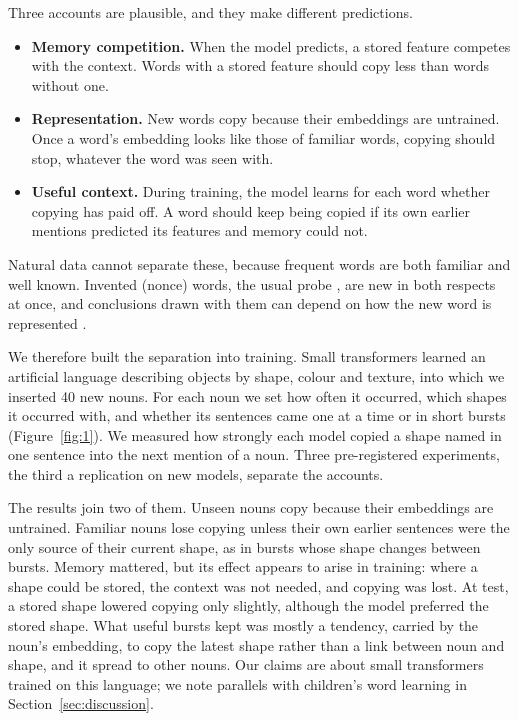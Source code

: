 \documentclass[11pt]{article}
\begin{document}
Three accounts are plausible, and they make different predictions.
\begin{itemize}[leftmargin=*,itemsep=1pt,topsep=2pt]
\item \textbf{Memory competition.} When the model predicts, a stored feature competes with the context. Words with a stored feature should copy less than words without one.
\item \textbf{Representation.} New words copy because their embeddings are untrained. Once a word's embedding looks like those of familiar words, copying should stop, whatever the word was seen with.
\item \textbf{Useful context.} During training, the model learns for each word whether copying has paid off. A word should keep being copied if its own earlier mentions predicted its features and memory could not.
\end{itemize}
Natural data cannot separate these, because frequent words are both familiar and well known. Invented (nonce) words, the usual probe \citep{thrush2020,misra2023}, are new in both respects at once, and conclusions drawn with them can depend on how the new word is represented \citep{kim2022lexical,cacioli2026me}.

We therefore built the separation into training. Small transformers learned an artificial language describing objects by shape, colour and texture, into which we inserted 40 new nouns. For each noun we set how often it occurred, which shapes it occurred with, and whether its sentences came one at a time or in short bursts (Figure~\ref{fig:1}). We measured how strongly each model copied a shape named in one sentence into the next mention of a noun. Three pre-registered experiments, the third a replication on new models, separate the accounts.

The results join two of them. Unseen nouns copy because their embeddings are untrained. Familiar nouns lose copying unless their own earlier sentences were the only source of their current shape, as in bursts whose shape changes between bursts. Memory mattered, but its effect appears to arise in training: where a shape could be stored, the context was not needed, and copying was lost. At test, a stored shape lowered copying only slightly, although the model preferred the stored shape. What useful bursts kept was mostly a tendency, carried by the noun's embedding, to copy the latest shape rather than a link between noun and shape, and it spread to other nouns. Our claims are about small transformers trained on this language; we note parallels with children's word learning in Section~\ref{sec:discussion}.
\end{document}
